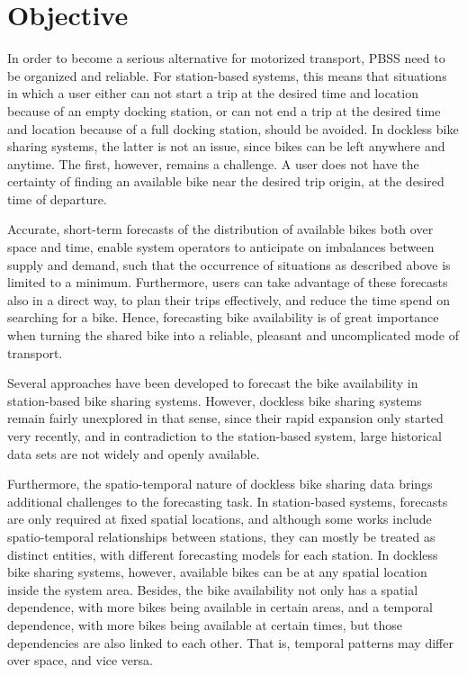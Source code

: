 \documentclass[12pt,oneside]{reedthesis}
\begin{document}
\section{Objective}\label{objective}

In order to become a serious alternative for motorized transport, PBSS
need to be organized and reliable. For station-based systems, this means
that situations in which a user either can not start a trip at the
desired time and location because of an empty docking station, or can
not end a trip at the desired time and location because of a full
docking station, should be avoided. In dockless bike sharing systems,
the latter is not an issue, since bikes can be left anywhere and
anytime. The first, however, remains a challenge. A user does not have
the certainty of finding an available bike near the desired trip origin,
at the desired time of departure.

Accurate, short-term forecasts of the distribution of available bikes
both over space and time, enable system operators to anticipate on
imbalances between supply and demand, such that the occurrence of
situations as described above is limited to a minimum. Furthermore,
users can take advantage of these forecasts also in a direct way, to
plan their trips effectively, and reduce the time spend on searching for
a bike. Hence, forecasting bike availability is of great importance when
turning the shared bike into a reliable, pleasant and uncomplicated mode
of transport.

Several approaches have been developed to forecast the bike availability
in station-based bike sharing systems. However, dockless bike sharing
systems remain fairly unexplored in that sense, since their rapid
expansion only started very recently, and in contradiction to the
station-based system, large historical data sets are not widely and
openly available.

Furthermore, the spatio-temporal nature of dockless bike sharing data
brings additional challenges to the forecasting task. In station-based
systems, forecasts are only required at fixed spatial locations, and
although some works include spatio-temporal relationships between
stations, they can mostly be treated as distinct entities, with
different forecasting models for each station. In dockless bike sharing
systems, however, available bikes can be at any spatial location inside
the system area. Besides, the bike availability not only has a spatial
dependence, with more bikes being available in certain areas, and a
temporal dependence, with more bikes being available at certain times,
but those dependencies are also linked to each other. That is, temporal
patterns may differ over space, and vice versa.
\end{document}

